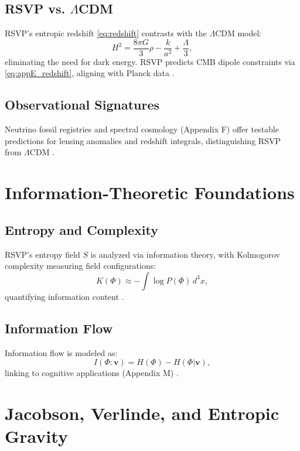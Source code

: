 \documentclass[12pt]{report}
\newcommand{\PhiRSVP}{\Phi}
\newcommand{\vRSVP}{\mathbf{v}}
\newcommand{\SRSVP}{S}
\begin{document}
\section{RSVP vs. \(\Lambda\)CDM}
RSVP’s entropic redshift \eqref{eq:redshift} contrasts with the \(\Lambda\)CDM model:
\begin{equation}
H^2 = \frac{8\pi G}{3}\rho - \frac{k}{a^2} + \frac{\Lambda}{3}, \label{eq:lambda_cdm}
\end{equation}
eliminating the need for dark energy. RSVP predicts CMB dipole constraints via \eqref{eq:appE_redshift}, aligning with Planck data \citep{Planck2020}.

\section{Observational Signatures}
Neutrino fossil registries and spectral cosmology (Appendix F) offer testable predictions for lensing anomalies and redshift integrals, distinguishing RSVP from \(\Lambda\)CDM \citep{RSVPMeta2025}.

\chapter{Information-Theoretic Foundations}
\label{app:I}
\section{Entropy and Complexity}
RSVP’s entropy field \(\SRSVP\) is analyzed via information theory, with Kolmogorov complexity measuring field configurations:
\begin{equation}
K(\PhiRSVP) \approx -\int \log P(\PhiRSVP) \, d^3x,
\end{equation}
quantifying information content \citep{Kolmogorov1965}.

\section{Information Flow}
Information flow is modeled as:
\begin{equation}
I(\PhiRSVP : \vRSVP) = H(\PhiRSVP) - H(\PhiRSVP | \vRSVP),
\end{equation}
linking to cognitive applications (Appendix M) \citep{RSVPMeta2025}.

\chapter{Jacobson, Verlinde, and Entropic Gravity}
\label{app:J}
\end{document}
